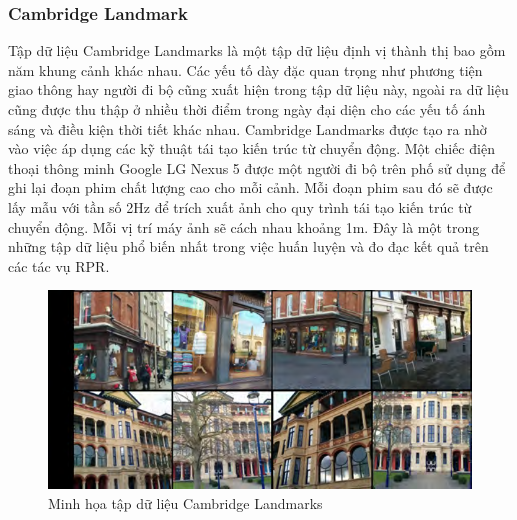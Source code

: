 \subsubsection*{Cambridge Landmark}
Tập dữ liệu Cambridge Landmarks \cite{kendall2016posenet} là một tập dữ liệu định vị thành thị bao gồm năm khung cảnh khác nhau. Các yếu tố dày đặc quan trọng như phương tiện giao thông hay người đi bộ cũng xuất hiện trong tập dữ liệu này, ngoài ra dữ liệu cũng được thu thập ở nhiều thời điểm trong ngày đại diện cho các yếu tố ánh sáng và điều kiện thời tiết khác nhau. Cambridge Landmarks được tạo ra nhờ vào việc áp dụng các kỹ thuật tái tạo kiến trúc từ chuyển động. Một chiếc điện thoại thông minh Google LG Nexus 5 được một người đi bộ trên phố sử dụng để ghi lại đoạn phim chất lượng cao cho mỗi cảnh. Mỗi đoạn phim sau đó sẽ được lấy mẫu với tần số 2Hz để trích xuất ảnh cho quy trình tái tạo kiến trúc từ chuyển động. Mỗi vị trí máy ảnh sẽ cách nhau khoảng 1m. Đây là một trong những tập dữ liệu phổ biến nhất trong việc huấn luyện và đo đạc kết quả trên các tác vụ RPR.
\begin{figure}[H]
	\centering
	\includegraphics[width=\textwidth]{pics/Chapter2/cambridge.png}
	\caption{Minh họa tập dữ liệu Cambridge Landmarks \cite{kendall2016posenet}}
\end{figure}
